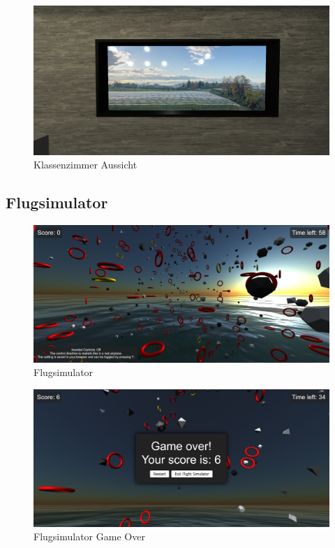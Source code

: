 \begin{figure}[H]
  \centering
  \includegraphics[width=1\textwidth]{images/finalproduct/screenshot_window_view.png}
  \caption{Klassenzimmer Aussicht}
  \label{fig:ScreenshotWindowView}
\end{figure}\noindent

\subsection{Flugsimulator}
\begin{figure}[H]
  \centering
  \includegraphics[width=1\textwidth]{images/finalproduct/screenshot_flightsim.png}
  \caption{Flugsimulator}
  \label{fig:ScreenshotFlightSim}
\end{figure}\noindent
\begin{figure}[H]
  \centering
  \includegraphics[width=1\textwidth]{images/finalproduct/screenshot_flightsim_score.png}
  \caption{Flugsimulator Game Over}
  \label{fig:ScreenshotFlightSimScore}
\end{figure}\noindent
